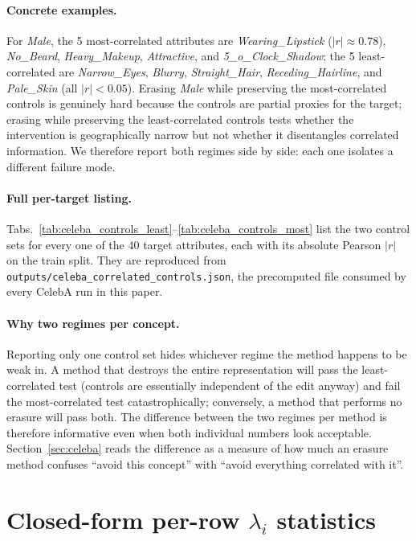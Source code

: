 \paragraph{Concrete examples.}
For \emph{Male}, the 5 most-correlated attributes are \emph{Wearing\_Lipstick} ($|r| \approx 0.78$), \emph{No\_Beard}, \emph{Heavy\_Makeup}, \emph{Attractive}, and \emph{5\_o\_Clock\_Shadow}; the 5 least-correlated are \emph{Narrow\_Eyes}, \emph{Blurry}, \emph{Straight\_Hair}, \emph{Receding\_Hairline}, and \emph{Pale\_Skin} (all $|r| < 0.05$). Erasing \emph{Male} while preserving the most-correlated controls is genuinely hard because the controls are partial proxies for the target; erasing while preserving the least-correlated controls tests whether the intervention is geographically narrow but not whether it disentangles correlated information. We therefore report both regimes side by side: each one isolates a different failure mode.

\paragraph{Full per-target listing.} Tabs.~\ref{tab:celeba_controls_least}--\ref{tab:celeba_controls_most} list the two control sets for every one of the 40 target attributes, each with its absolute Pearson $|r|$ on the train split. They are reproduced from \texttt{outputs/celeba\_correlated\_controls.json}, the precomputed file consumed by every CelebA run in this paper.




\paragraph{Why two regimes per concept.}
Reporting only one control set hides whichever regime the method happens to be weak in. A method that destroys the entire representation will pass the least-correlated test (controls are essentially independent of the edit anyway) and fail the most-correlated test catastrophically; conversely, a method that performs no erasure will pass both. The difference between the two regimes per method is therefore informative even when both individual numbers look acceptable. Section~\ref{sec:celeba} reads the difference as a measure of how much an erasure method confuses ``avoid this concept'' with ``avoid everything correlated with it''.

\section{Closed-form per-row $\lambda_i$ statistics}
\label{sec:appendix_lambda_stats}

